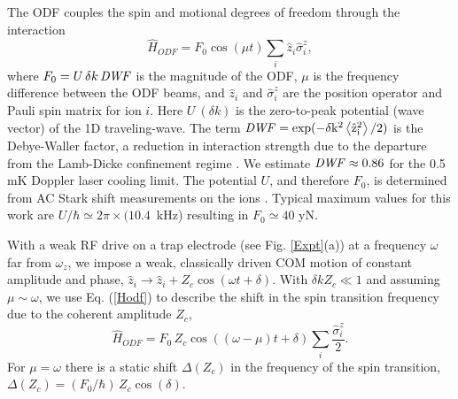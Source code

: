 \documentclass[aps,prl,twocolumn,superscriptaddress,floatfix]{revtex4-1}
\begin{document}
The ODF couples the spin and motional degrees of freedom through the interaction \citep{Bohnet2015}
\begin{equation}
\hat{H}_{ODF} = F_0\cos\left(\mu t \right)\sum_{i} \hat{z}_{i} \hat{\sigma}^{z}_{i},
\label{Hodf}
\end{equation}
where $F_0= U \, \delta k \, \rm{\it{DWF}}$ is the magnitude of the ODF, $\mu$ is the frequency difference between the ODF beams, and $\hat{z}_{i}$ and $\hat{\sigma}^{z}_{i}$ are the position operator and Pauli spin matrix for ion $i$. Here $U\:(\delta k)$ is the zero-to-peak potential (wave vector) of the 1D traveling-wave. The term $\rm{\it{DWF}} = \exp(-\delta k^2 \left< \hat{z}^{2}_{i} \right> / 2)$ is the Debye-Waller factor, a reduction in interaction strength due to the departure from the Lamb-Dicke confinement regime \citep{Wineland1998a}. We estimate $\rm{\it{DWF}} \approx 0.86 $ for the 0.5 mK Doppler laser cooling limit. The potential $U$, and therefore $F_0$, is determined from AC Stark shift measurements on the ions \citep{Britton2012}. Typical maximum values for this work are $U/\hbar \simeq 2 \pi \times (10.4$~kHz) resulting in $F_0 \simeq 40$ yN.

With a weak RF drive on a trap electrode (see Fig. \ref{Expt}(a)) at a frequency $\omega$ far from $\omega_{z}$, we impose a weak, classically driven COM motion of constant amplitude and phase, $\hat{z}_i \rightarrow \hat{z}_i +Z_c\cos(\omega t+\delta)$. With $\delta k Z_c \ll 1$ and assuming $\mu\sim\omega$, we use Eq. (\ref{Hodf}) to describe the shift in the spin transition frequency due to the coherent amplitude $Z_c$,
\begin{equation}
\hat{H}_{ODF} = F_{0} \, Z_c\cos((\omega - \mu)t + \delta) \sum_{i} \frac{\hat{\sigma}^{z}_{i}}{2} .
\end{equation}
For $\mu = \omega$ there is a static shift $\Delta(Z_c)$ in the frequency of the spin transition, $\Delta(Z_c) = (F_{0}/\hbar) \, Z_c \cos(\delta)$.
\end{document}
